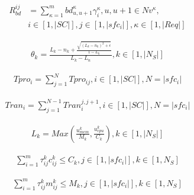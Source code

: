 \documentclass{ieeeaccess}
\begin{document}
\begin{equation}
  \begin{aligned}
    R_{bd}^{ij}&= \sum_{\kappa=1}^{m}bd_{u,u+1}^{\kappa} \gamma_{i}^{\kappa}, u,u+1 \in Nv^{\kappa}, \\
    &i \in \left [ 1,|SC| \right ], j \in \left [ 1,|sfc_{i}| \right ],\kappa \in \left [ 1,|Req| \right ]
  \end{aligned}
\end{equation}

\begin{equation}
  \begin{aligned}
\theta _{k}=\frac{L_{k}-n_{k}+\frac{\sqrt{\left ( L_{k}-n_{k} \right )^{2}+\epsilon  }}{1-L_{k}}}{L_{k}-L_{n}},k \in \left [ 1,|N_{S}| \right ]
  \end{aligned}
\end{equation}

\begin{equation}
\begin{aligned}
Tpro_{i}=\sum_{j=1}^{N}Tpro_{ij},i \in \left [ 1,|SC| \right ],N=|sfc_{i}|
\end{aligned}
\end{equation}

\begin{equation}
  \begin{aligned}
Tran_{i}=\sum_{j=1}^{N-1}Tran_{i}^{j,j+1},i \in \left [ 1,|SC| \right ],N=|sfc_{i}|
  \end{aligned}
\end{equation}

\begin{equation}
  \begin{aligned}
  L_{k}=Max(\frac{u_{mem}^{k}}{M_{k}},\frac{u_{cpu}^{k}}{C_{k}}),k \in \left [ 1,|N_{S}| \right ]
  \end{aligned}
\end{equation}

\begin{equation}
\begin{aligned}
\sum_{i=1}^{m}\tau _{ij}^{k}c_{ij}^{k}\leq C_{k},j \in \left [ 1,|sfc_{i}| \right ],k \in \left [ 1,N_{S} \right ]
\end{aligned}
\end{equation}

\begin{equation}
\begin{aligned}
\sum_{i=1}^{m}\tau _{ij}^{k}m_{ij}^{k}\leq M_{k},j \in \left [ 1,|sfc_{i}| \right ],k \in \left [ 1,N_{S} \right ]
\end{aligned}
\end{equation}
\end{document}
